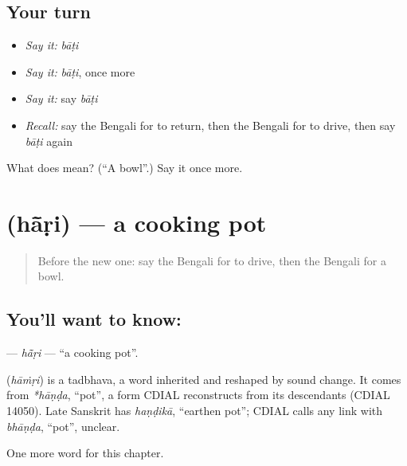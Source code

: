 \subsection*{Your turn}
\begin{itemize}
\raggedright
  \item \emph{Say it:} \emph{bāṭi}
  \item \emph{Say it:} \emph{bāṭi}, once more
  \item \emph{Say it:} say \emph{bāṭi}
  \item \emph{Recall:} say the Bengali for to return, then the Bengali for to drive, then say \emph{bāṭi} again
\end{itemize}

\begin{tcolorbox}[breakable,colback=teal!4,colframe=teal!35!black,title={Before you move on}]
What does  mean? (\textquotedblleft{}A bowl\textquotedblright{}.) Say it once more.
\end{tcolorbox}
\section[\texorpdfstring{\bn{হাঁড়ি} (hā̃ṛi)}{হাঁড়ি (hā̃ṛi)}]{ (hā̃ṛi) — a cooking pot}

\label{lesson:BN-C107-hari}



\begin{quote}
Before the new one: say the Bengali for to drive, then the Bengali for a bowl.
\end{quote}

\subsection*{You'll want to know: }
\textbf{} — \emph{hā̃ṛi} — \textquotedblleft{}a cooking pot\textquotedblright{}.

\begin{cousinweb}
\textbf{} (\emph{hāṁṛi}) is a tadbhava, a word inherited and reshaped by sound change. It comes from \emph{*hāṇḍa}, \textquotedblleft{}pot\textquotedblright{}, a form CDIAL reconstructs from its descendants (CDIAL 14050). Late Sanskrit has \emph{haṇḍikā}, \textquotedblleft{}earthen pot\textquotedblright{}; CDIAL calls any link with \emph{bhāṇḍa}, \textquotedblleft{}pot\textquotedblright{}, unclear.
\end{cousinweb}

\begin{grammarlens}[title={What you've built}]
One more word for this chapter.
\end{grammarlens}

